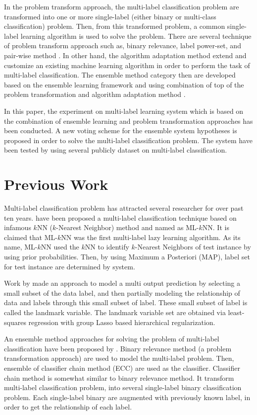 \documentclass{article}
\begin{document}
In the problem transform approach, the multi-label classification problem are transformed into one or more single-label (either binary or multi-class classification) problem. Then, from this transformed problem, a common single-label learning algorithm is used to solve the problem. There are several technique of problem transform approach such as, binary relevance, label power-set, and pair-wise method \cite{Madjarov2012}. In other hand, the algorithm adaptation method extend and customize an existing machine learning algorithm in order to perform the task of multi-label classification. The ensemble method category then are developed based on the ensemble learning framework and using combination of top of the problem transformation and algorithm adaptation method \cite{Madjarov2012}.

In this paper, the experiment on multi-label learning system which is based on the combination of ensemble learning and problem transformation approaches has been conducted. A new voting scheme for the ensemble system hypotheses is proposed in order to solve the multi-label classification problem. The system have been tested by using several publicly dataset on multi-label classification.

\section{Previous Work}
\label{related}

Multi-label classification problem has attracted several researcher for over past  ten years. \cite{Zhang2007} have been proposed a multi-label classification technique based on infamous $k$NN ($k$-Nearest Neighbor) method and named as ML-$k$NN. It is claimed that ML-$k$NN was the first multi-label lazy learning algorithm. As its name, ML-$k$NN used the $k$NN to identify $k$-Nearest Neighbors of test instance by using prior probabilities. Then, by using Maximum a Posteriori (MAP), label set for test instance are determined by system.

Work by \cite{Balasubramanian2012} made an approach to model a multi output prediction by selecting a small subset of the data label, and then partially modeling the relationship of data and labels through this small subset of label. These small subset of label is called the landmark variable. The landmark variable set are obtained via least-squares regression with group Lasso based hierarchical regularization. 

An ensemble method approaches for solving the problem of multi-label classification have been proposed by \cite{Read2011}. Binary relevance method (a problem transformation approach) are used to model the multi-label problem. Then, ensemble of classifier chain method (ECC) are used as the classifier. Classifier chain method is somewhat similar to binary relevance method. It transform multi-label classification problem, into several single-label binary classification problem. Each single-label binary are augmented with previously known label, in order to get the relationship of each label.
\end{document}
